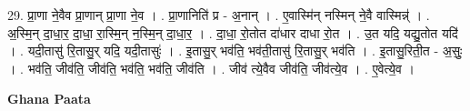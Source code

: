 \documentclass[17pt]{extarticle}
\begin{document}
29. प्रा॒णा ने॒वैव प्रा॒णान् प्रा॒णा ने॒व । . प्रा॒णानिति॑ प्र - अ॒नान् । . ए॒वास्मि॑न् नस्मिन् ने॒वै वास्मिन्न्॑ । . अ॒स्मि॒न् दा॒धा॒र॒ दा॒धा॒ रा॒स्मि॒न् न॒स्मि॒न् दा॒धा॒र॒ । . दा॒धा॒ रो॒तोत दा॑धार दाधा रो॒त । . उ॒त यदि॒ यद्यु॒तोत यदि॑ । . यदी॒तासु॑ रि॒तासु॒र् यदि॒ यदी॒तासुः॑ । . इ॒तासु॒र् भव॑ति॒ भव॑ती॒तासु॑ रि॒तासु॒र् भव॑ति । . इ॒तासु॒रिती॒त - अ॒सुः॒ । . भव॑ति॒ जीव॑ति॒ जीव॑ति॒ भव॑ति॒ भव॑ति॒ जीव॑ति । . जीव॑ त्ये॒वैव जीव॑ति॒ जीव॑त्ये॒व । . ए॒वेत्ये॒व । \newline

\textbf{Ghana Paata } \newline
\end{document}
